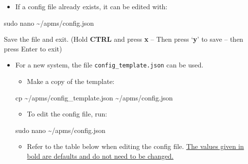 \documentclass[
  letterpaper,
]{scrbook}
\newenvironment{Shaded}{\begin{snugshade}}{\end{snugshade}}
\newcommand{\FunctionTok}[1]{\textcolor[rgb]{0.28,0.35,0.67}{#1}}
\newcommand{\NormalTok}[1]{\textcolor[rgb]{0.00,0.23,0.31}{#1}}
\providecommand{\tightlist}{%
  \setlength{\itemsep}{0pt}\setlength{\parskip}{0pt}}
\begin{document}
\begin{itemize}
\tightlist
\item
  If a config file already exists, it can be edited with:
\end{itemize}

\begin{Shaded}
\begin{Highlighting}[]
\FunctionTok{sudo}\NormalTok{ nano \textasciitilde{}/apms/config.json}
\end{Highlighting}
\end{Shaded}

Save the file and exit. (Hold \textbf{CTRL} and press \textbf{x} -- Then
press `\textbf{y}' to save -- then press Enter to exit)

\begin{itemize}
\item
  For a new system, the file \texttt{config\_template.json} can be used.

  \begin{itemize}
  \tightlist
  \item
    Make a copy of the template:
  \end{itemize}

\begin{Shaded}
\begin{Highlighting}[]
\FunctionTok{cp}\NormalTok{ \textasciitilde{}/apms/config\_template.json \textasciitilde{}/apms/config.json}
\end{Highlighting}
\end{Shaded}

  \begin{itemize}
  \tightlist
  \item
    To edit the config file, run:
  \end{itemize}

\begin{Shaded}
\begin{Highlighting}[]
\FunctionTok{sudo}\NormalTok{ nano \textasciitilde{}/apms/config.json}
\end{Highlighting}
\end{Shaded}

  \begin{itemize}
  \tightlist
  \item
    Refer to the table below when editing the config file. \ul{The
    values given in bold are defaults and do not need to be changed.}
  \end{itemize}
\end{itemize}
\end{document}
